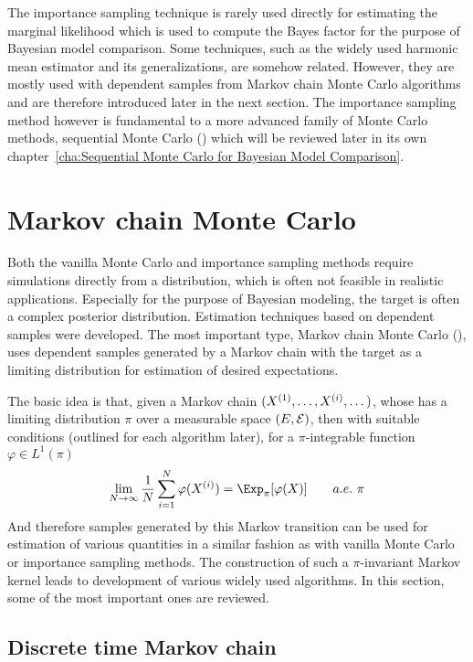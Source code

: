 The importance sampling technique is rarely used directly for estimating the
marginal likelihood which is used to compute the Bayes factor for the purpose
of Bayesian model comparison. Some techniques, such as the widely used
harmonic mean estimator and its generalizations, are somehow related. However,
they are mostly used with dependent samples from Markov chain Monte Carlo
algorithms and are therefore introduced later in the next section. The
importance sampling method however is fundamental to a more advanced family of
Monte Carlo methods, sequential Monte Carlo (\smc) which will be reviewed
later in its own chapter~\ref{cha:Sequential Monte Carlo for Bayesian Model
  Comparison}.

\section{Markov chain Monte Carlo}
\label{sec:Markov chain Monte Carlo}

Both the vanilla Monte Carlo and importance sampling methods require
simulations directly from a distribution, which is often not feasible in
realistic applications. Especially for the purpose of Bayesian modeling, the
target is often a complex posterior distribution. Estimation techniques based
on dependent samples were developed. The most important type, Markov chain
Monte Carlo (\mcmc), uses dependent samples generated by a Markov chain with
the target as a limiting distribution for estimation of desired expectations.

The basic idea is that, given a Markov chain $(X^{(1)},\dots,X^{(i)},\dots)$,
whose has a limiting distribution $\pi$ over a measurable space $(E,\mathcal{E})$,
then with suitable conditions (outlined for each algorithm later), for a
$\pi$-integrable function $\varphi \in L^1(\pi)$
\begin{equation}
  \lim_{N\to\infty}\frac{1}{N}\sum_{i=1}^N\varphi(\Xiu) =
  \Exp_{\pi}[\varphi(X)]\qquad a.e.\ \pi
  \label{eq:mcmc convergence}
\end{equation}
And therefore samples generated by this Markov transition can be used for
estimation of various quantities in a similar fashion as with vanilla Monte
Carlo or importance sampling methods. The construction of such a
$\pi$-invariant Markov kernel leads to development of various widely used
\mcmc algorithms. In this section, some of the most important ones are
reviewed.

\subsection{Discrete time Markov chain}
\label{sub:Discrete time Markov chain}

